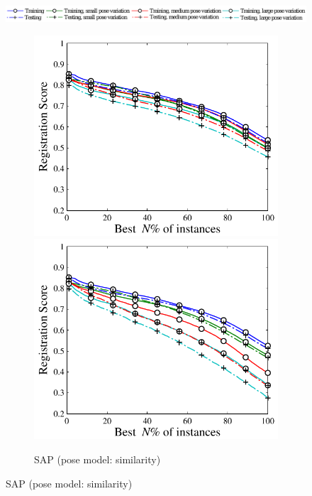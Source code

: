 \begin{figure}[ht]
\centering 
\includegraphics[width=1\linewidth]{fig/3dreg/reg2d_legend.pdf}
\begin{subfigure}[b]{0.48\linewidth}
	\includegraphics[width=\linewidth]{fig/3dreg/reg2d_simsim.pdf}\vspace{3mm} 
	\includegraphics[width=\linewidth]{fig/3dreg/reg2d_simaff.pdf}
	\caption{SAP (pose model: similarity)}
\end{subfigure}

\end{figure}

